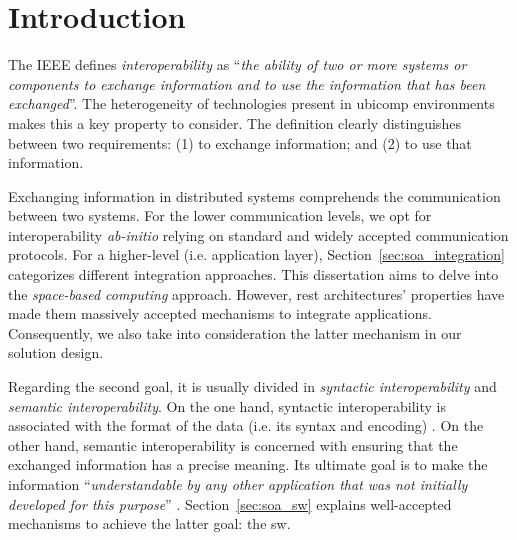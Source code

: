 \section{Introduction}
\label{sec:soa_intro}



The IEEE \citep{_ieee_1990} defines \emph{interoperability} as ``\emph{the ability of two or more systems or components to exchange information and to use the information that has been exchanged}''.
The heterogeneity of technologies present in \ac{ubicomp} environments makes this a key property to consider.
The definition clearly distinguishes between two requirements: %
(1) to exchange information; and
(2) to use that information. %


Exchanging information in distributed systems comprehends the communication between two systems.
For the lower communication levels, we opt for interoperability \emph{ab-initio} relying on standard and widely accepted communication protocols. %
For a higher-level (i.e. application layer), Section~\ref{sec:soa_integration} categorizes different integration approaches.
This dissertation aims to delve into the \emph{space-based computing} approach. %
However, \ac{rest} architectures' properties have made them massively accepted mechanisms to integrate applications.
Consequently, we also take into consideration the latter mechanism in our solution design.


Regarding the second goal, it is usually divided in \emph{syntactic interoperability} and \emph{semantic interoperability}.
On the one hand, syntactic interoperability is associated with the format of the data (i.e. its syntax and encoding) \citep{van_der_veer_achieving_2006}. %
On the other hand, semantic interoperability is concerned with ensuring that the exchanged information has a precise meaning.
Its ultimate goal is to make the information ``\emph{understandable by any other application that was not initially developed for this purpose}'' \citep{_european_2004}.
Section~\ref{sec:soa_sw} explains well-accepted mechanisms to achieve the latter goal: the \acl{sw}. %



